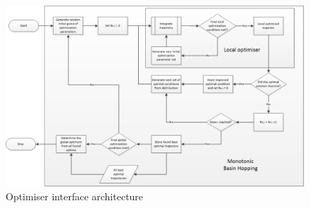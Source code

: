 \begin{figure}[!ht]
\centering
\includegraphics[width=1.5\textwidth, angle = 90]{figures/software/optimiser.png}
\caption{Optimiser interface architecture}
\label{fig:optimiser}
\end{figure}



